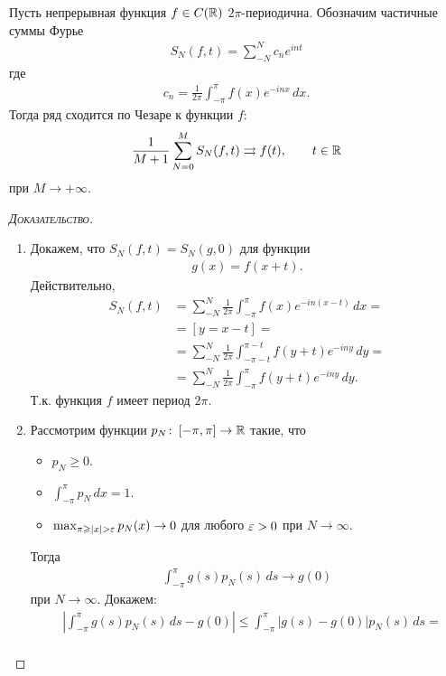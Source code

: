 \documentclass[../complex-analysis.tex]{subfiles}
\begin{document}
\begin{thm}[Фейера]
 Пусть непрерывная функция $ f \in C(\mathbb{R}) $ $ 2\pi $-периодична. Обозначим частичные суммы Фурье
 \begin{align*}
  S_{N} (f,t) = \sum_{-N}^{N} c_ne^{int}
 \end{align*} где
 \begin{align*}
  c_n = \frac{1}{2\pi} \int_{-\pi}^{\pi} f(x)e^{-inx}\,dx.
 \end{align*} Тогда ряд сходится по Чезаре к функции $ f $:
 \begin{align*}
  \frac{1}{M+1} \sum_{N=0}^{M} S_N(f,t) \rightrightarrows f(t), \qquad t \in \mathbb{R}
 \end{align*} при $ M \to + \infty$.
\end{thm}
\begin{proof}[\normalfont\textsc{Доказательство}]\
 \begin{enumerate}
  \item Докажем, что $ S_N(f,t) = S_N(g, 0) $ для функции
    \begin{align*}
    g(x) = f(x + t).
   \end{align*} Действительно,
   \begin{align*}
    S_N(f,t) &= \sum_{-N}^{N} \frac{1}{2\pi} \int_{-\pi}^{\pi} f(x)e^{-in(x-t)}\,dx =  \\
	&= [y = x - t] = \\
    &= \sum_{-N}^{N} \frac{1}{2\pi} \int_{-\pi - t}^{\pi - t} f(y + t)e^{-iny}\,dy = \\
    &= \sum_{-N}^{N}\frac{1}{2\pi} \int_{-\pi}^{\pi} f(y+t)e^{-iny}\,dy.
\end{align*} Т.к. функция $f$ имеет период $2 \pi$.  
  \item Рассмотрим функции $ p_N \colon\, [-\pi,\pi] \to \mathbb{R} $ такие, что
   \begin{itemize}
    \item $ p_N \geqslant 0 $.
    \item $ \int_{-\pi}^{\pi} p_N\,dx = 1  $.
    \item $ \max_{\pi \geqslant \left| x \right| > \varepsilon} p_N(x) \to 0 $ для любого $ \varepsilon > 0 $ при $ N \to \infty $.
   \end{itemize} Тогда 
   \begin{align*}
    \int_{-\pi}^{\pi} g(s)p_N(s)\,ds \to g(0)
   \end{align*} при $ N \to \infty $. Докажем:
   \begin{align*}
    &\left|\int_{-\pi}^{\pi} g(s)p_N(s)\,ds - g(0) \right| \leqslant \int_{-\pi}^{\pi} \left| g(s) - g(0) \right|p_N(s)\,ds = \\

\end{align*}
\end{enumerate}
\end{proof}
\end{document}

